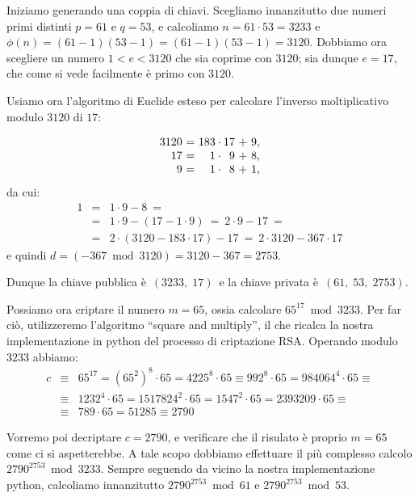 \documentclass[pdflatex,11pt,a4paper,oneside]{article}
\newcommand{\p}[1]{\left({#1}\right)}
\newcommand{\ephi}[1]{\ensuremath{\phi\p{#1}}}
\newcommand{\congruent}[0]{\equiv}
\newcommand{\mmodop}[0]{\ensuremath{\operatorname{mod}}}
\newcommand{\rem}[2]{\ensuremath{{#1}\:\mmodop\:{#2}}}
\begin{document}
Iniziamo generando una coppia di chiavi. Scegliamo innanzitutto due numeri
primi distinti $p = 61$ e $q = 53$, e calcoliamo $n = 61 \cdot 53 = 3233$
e $\ephi{n} = (61 − 1)(53 − 1) = (61 − 1)(53 − 1) = 3120$. Dobbiamo ora
scegliere un numero $1 < e < 3120$ che sia coprime con $3120$; sia dunque
 $e = 17$, che come si vede facilmente \`e primo con $3120$.

\noindent
Usiamo ora l'algoritmo di Euclide esteso per calcolare l'inverso
moltiplicativo modulo $3120$ di $17$:

\begin{displaymath}
  \begin{array}{r@{~=~}r@{\:\cdot\:}r@{~+~}r}
  3120 & 183 & 17 & 9, \\
    17 &   1 &  9 & 8, \\
     9 &   1 &  8 & 1, \\
  \end{array}
\end{displaymath}
da cui:
\begin{eqnarray*}
    1 & = & 1 \cdot 9 - 8 ~= \\
      & = & 1 \cdot 9 - \p{ 17 - 1 \cdot 9 }
      ~ = ~ 2 \cdot 9 - 17 ~= \\
      & = & 2 \cdot \p{ 3120 - 183 \cdot 17 } - 17
      ~ = ~ 2 \cdot 3120 - 367 \cdot 17
\end{eqnarray*}
e quindi $d = \p{\rem{-367}{3120}} = 3120 - 367 = 2753$.

\smallskip\noindent
Dunque la chiave pubblica \`e \,$(3233,\;17)$\, e la chiave privata
\`e \,$(61,\;53,\;2753)$.

\medskip\noindent
Possiamo ora criptare il numero $m = 65$, ossia calcolare
$\rem{{65}^{17}}{3233}$. Per far ci\`o, utilizzeremo l'algoritmo ``square
and multiply'', il che ricalca la nostra implementazione in python del
processo di criptazione RSA. Operando modulo $3233$ abbiamo:
\begin{eqnarray*}
c & \congruent\!\! &
    65^{17} = {\p{{65^2}}}^8 \cdot 65 = 4225^8 \cdot 65
    \congruent 992^8 \cdot 65 = 984064^4 \cdot 65 \congruent
  \\
  & \congruent\!\! &
    1232^4 \cdot 65 = 1517824^2 \cdot 65 = 1547^2 \cdot 65
    = 2393209 \cdot 65 \congruent
  \\
  & \congruent\!\! &
    789 \cdot 65 = 51285 \congruent 2790
\end{eqnarray*}

\noindent
Vorremo poi decriptare $c = 2790$, e verificare che il risulato \`e
proprio $m = 65$ come ci si aspetterebbe. A tale scopo dobbiamo
effettuare il pi\`u complesso calcolo $\rem{2790^{2753}}{3233}$.
Sempre seguendo da vicino la nostra implementazione python, calcoliamo
innanzitutto $\rem{2790^{2753}}{61}$ e $\rem{2790^{2753}}{53}$.
\end{document}
